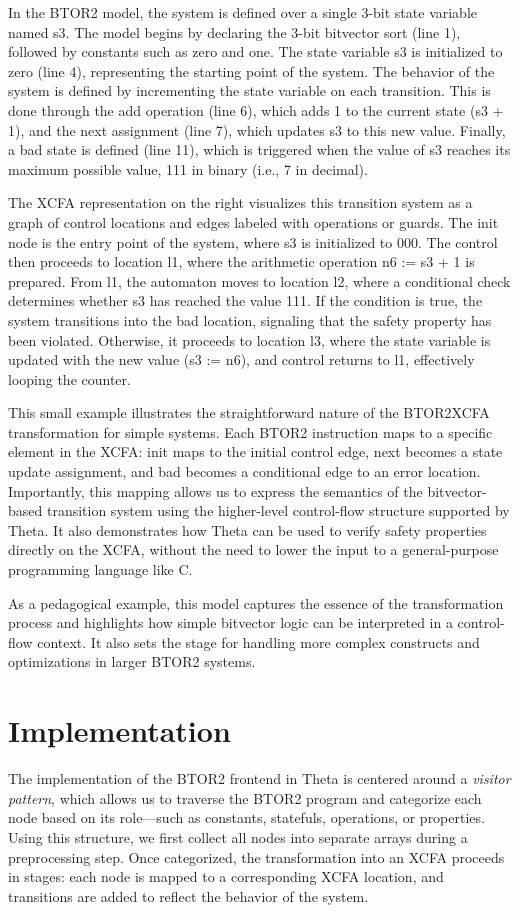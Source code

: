 In the BTOR2 model, the system is defined over a single 3-bit state variable named s3. The model begins by declaring the 3-bit bitvector sort (line 1), followed by constants such as zero and one. The state variable s3 is initialized to zero (line 4), representing the starting point of the system. The behavior of the system is defined by incrementing the state variable on each transition. This is done through the add operation (line 6), which adds 1 to the current state (s3 + 1), and the next assignment (line 7), which updates s3 to this new value. Finally, a bad state is defined (line 11), which is triggered when the value of s3 reaches its maximum possible value, 111 in binary (i.e., 7 in decimal).

The XCFA representation on the right visualizes this transition system as a graph of control locations and edges labeled with operations or guards. The init node is the entry point of the system, where s3 is initialized to 000. The control then proceeds to location l1, where the arithmetic operation n6 := s3 + 1 is prepared. From l1, the automaton moves to location l2, where a conditional check determines whether s3 has reached the value 111. If the condition is true, the system transitions into the bad location, signaling that the safety property has been violated. Otherwise, it proceeds to location l3, where the state variable is updated with the new value (s3 := n6), and control returns to l1, effectively looping the counter.

This small example illustrates the straightforward nature of the BTOR2XCFA transformation for simple systems. Each BTOR2 instruction maps to a specific element in the XCFA: init maps to the initial control edge, next becomes a state update assignment, and bad becomes a conditional edge to an error location. Importantly, this mapping allows us to express the semantics of the bitvector-based transition system using the higher-level control-flow structure supported by Theta. It also demonstrates how Theta can be used to verify safety properties directly on the XCFA, without the need to lower the input to a general-purpose programming language like C.

As a pedagogical example, this model captures the essence of the transformation process and highlights how simple bitvector logic can be interpreted in a control-flow context. It also sets the stage for handling more complex constructs and optimizations in larger BTOR2 systems.

\section{Implementation}
The implementation of the BTOR2 frontend in Theta is centered around a \textit{visitor pattern}, which allows us to traverse the BTOR2 program and categorize each node based on its role—such as constants, statefuls, operations, or properties. Using this structure, we first collect all nodes into separate arrays during a preprocessing step. Once categorized, the transformation into an XCFA proceeds in stages: each node is mapped to a corresponding XCFA location, and transitions are added to reflect the behavior of the system.

